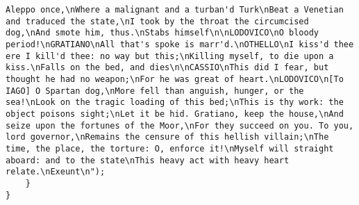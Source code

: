 \begin{verbatim}
Aleppo once,\nWhere a malignant and a turban'd Turk\nBeat a Venetian and traduced the state,\nI took by the throat the circumcised dog,\nAnd smote him, thus.\nStabs himself\n\nLODOVICO\nO bloody period!\nGRATIANO\nAll that's spoke is marr'd.\nOTHELLO\nI kiss'd thee ere I kill'd thee: no way but this;\nKilling myself, to die upon a kiss.\nFalls on the bed, and dies\n\nCASSIO\nThis did I fear, but thought he had no weapon;\nFor he was great of heart.\nLODOVICO\n[To IAGO] O Spartan dog,\nMore fell than anguish, hunger, or the sea!\nLook on the tragic loading of this bed;\nThis is thy work: the object poisons sight;\nLet it be hid. Gratiano, keep the house,\nAnd seize upon the fortunes of the Moor,\nFor they succeed on you. To you, lord governor,\nRemains the censure of this hellish villain;\nThe time, the place, the torture: O, enforce it!\nMyself will straight aboard: and to the state\nThis heavy act with heavy heart relate.\nExeunt\n");
	}
}

\end{verbatim}